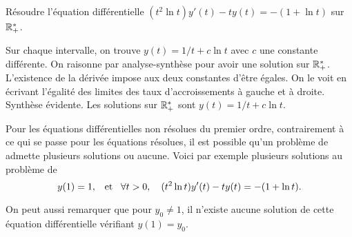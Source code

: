 \documentclass{magnolia}
\begin{document}
\begin{exoUnique}
\exo Résoudre l'équation différentielle
  $(t^2\ln t)y'(t)-ty(t)=-(1+\ln t)$ sur $\mathbb{R}_+^*$.
  \begin{sol}
  Sur chaque intervalle, on trouve $y(t)=1/t+c\ln t$ avec $c$ une constante différente. On raisonne par analyse-synthèse pour avoir une solution sur $\mathbb{R}_+^*$. L'existence de la dérivée impose aux deux constantes d'être égales. On le voit en écrivant l'égalité des limites des taux d'accroissements à gauche et à droite. Synthèse évidente. Les solutions sur $\mathbb{R}_+^*$
  sont $y(t)=1/t+c\ln t$.
  \end{sol}
\end{exoUnique}

\begin{remarqueUnique}
\remarque Pour les équations différentielles non résolues du premier ordre, 
  contrairement à ce qui se passe pour les équations résolues, il est possible
  qu'un problème de  admette plusieurs solutions ou aucune. Voici par exemple
  plusieurs solutions au problème de 
  \[y(1)=1, \quad\!\text{et}\quad\! \forall t>0,\quad (t^2\ln t)y'(t)-ty(t)=-(1+\ln t).\]
\begin{center}
\end{center}
  On peut aussi remarquer que pour $y_0\neq 1$, il n'existe aucune solution de cette équation différentielle
  vérifiant $y(1)=y_0$.
\end{remarqueUnique}

\end{document}
